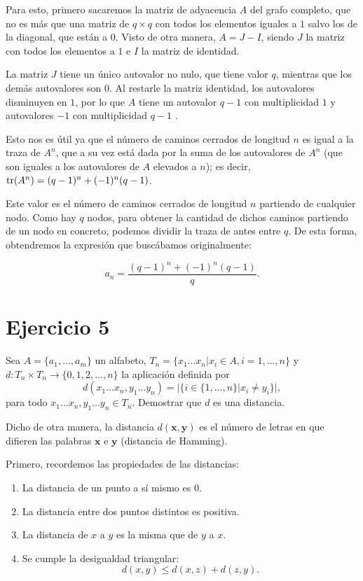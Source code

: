 \begin{enumerate}[label=\alph*)]
	Para esto, primero sacaremos la matriz de adyacencia $A$ del grafo completo, que no es más que una matriz de $q\times q$ con todos los elementos iguales a $1$ salvo los de la diagonal, que están a $0$. Visto de otra manera, $A = J-I$, siendo $J$ la matriz con todos los elementos a $1$ e $I$ la matriz de identidad.
	
	La matriz $J$ tiene un único autovalor no nulo, que tiene valor $q$, mientras que los demás autovalores son $0$. Al restarle la matriz identidad, los autovalores disminuyen en $1$, por lo que $A$ tiene un autovalor $q-1$ con multiplicidad $1$ y autovalores $-1$ con multiplicidad $q-1$ \cite{fox2009}.
	
	Esto nos es útil ya que el número de caminos cerrados de longitud $n$ es igual a la traza de $A^n$, que a su vez está dada por la suma de los autovalores de $A^n$ (que son iguales a los autovalores de $A$ elevados a $n$); es decir, $\operatorname{tr}(A^n) = (q-1)^n + (-1)^n(q-1)$.
	
	Este valor es el número de caminos cerrados de longitud $n$ partiendo de cualquier nodo. Como hay $q$ nodos, para obtener la cantidad de dichos caminos partiendo de un nodo en concreto, podemos dividir la traza de antes entre $q$. De esta forma, obtendremos la expresión que buscábamos originalmente:
	
	\[a_n = \frac{(q-1)^n + (-1)^n(q-1)}{q}.\]
\end{enumerate}
	
\section{Ejercicio 5}

\begin{formulationBox}
	Sea $A = \{a_1,\hdots,a_m\}$ un alfabeto, $T_n = \{x_1\hdots x_n|x_i\in A, i=1,\hdots,n\}$ y $d:T_n\times T_n\rightarrow\{0,1,2,\hdots,n\}$ la aplicación definida por
	\[d(x_1\hdots x_n, y_1\hdots y_n) = |\{i\in\{1,\hdots,n\}|x_i\neq y_i\}|,\]
	para todo $x_1\hdots x_n, y_1\hdots y_n\in T_n$. Demostrar que $d$ es una distancia.
\end{formulationBox}

Dicho de otra manera, la distancia $d(\textbf{x}, \textbf{y})$ es el número de letras en que difieren las palabras $\textbf{x}$ e $\textbf{y}$ (distancia de Hamming).

Primero, recordemos las propiedades de las distancias:

\begin{enumerate}[label=\alph*)]
	\item La distancia de un punto a sí mismo es $0$.
	\item La distancia entre dos puntos distintos es positiva.
	\item La distancia de $x$ a $y$ es la misma que de $y$ a $x$.
	\item Se cumple la desigualdad triangular:
	\[d(x, y) \leq d(x, z) + d(z, y).\]
\end{enumerate}

